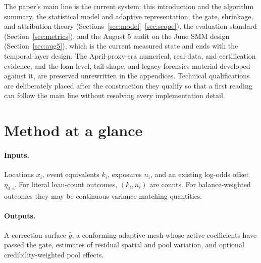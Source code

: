 \documentclass[11pt]{article}
\begin{document}
The paper's main line is the current system: this introduction and the algorithm summary,
the statistical model and adaptive representation, the gate, shrinkage, and attribution
theory (Sections~\ref{sec:model}--\ref{sec:scope}), the evaluation standard
(Section~\ref{sec:metrics}), and the August 5 audit on the June SMM design
(Section~\ref{sec:aug5}), which is the current measured state and ends with the
temporal-layer design. The April-proxy-era numerical, real-data, and certification
evidence, and the loan-level, tail-shape, and legacy-forensics material developed
against it, are preserved unrewritten in the appendices.
Technical qualifications are deliberately placed after the construction they qualify so that a first
reading can follow the main line without resolving every implementation detail.

\section{Method at a glance}\label{sec:overview}

\paragraph{Inputs.} Locations $x_i$, event equivalents $k_i$, exposures $n_i$, and an existing
log-odds offset $\eta_{0,i}$. For literal loan-count outcomes, $(k_i,n_i)$ are counts. For
balance-weighted outcomes they may be continuous variance-matching quantities.

\paragraph{Outputs.} A correction surface $\hat g$, a conforming adaptive mesh whose active
coefficients have passed the gate, estimates of residual spatial and pool variation, and optional
credibility-weighted pool effects.
\end{document}
